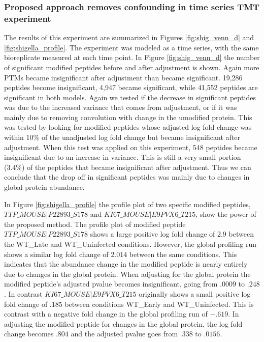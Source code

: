 \documentclass[mcp]{article}
\numberwithin{table}{section}
\begin{document}
\subsubsection*{Proposed approach removes confounding in time series TMT experiment}

The results of this experiment are summarized in Figures \ref{fig:shig_venn_d} and \ref{fig:shigella_profile}. The experiment was modeled as a time series, with the same bioreplicate measured at each time point. In Figure \ref{fig:shig_venn_d} the number of significant modified peptides before and after adjustment is shown. Again more PTMs became insignificant after adjustment than became significant. 19,286 peptides become insignificant, 4,947 became significant, while 41,552 peptides are significant in both models. Again we tested if the decrease in significant peptides was due to the increased variance that comes from adjustment, or if it was mainly due to removing convolution with change in the umodified protein. This was tested by looking for modified peptides whose adjusted log fold change was within 10\% of the unadjusted log fold change but became insignificant after adjustment. When this test was applied on this experiment, 548 peptides became insignificant due to an increase in variance. This is still a very small portion (3.4\%) of the peptides that became insignificant after adjustment. Thus we can conclude that the drop off in significant peptides was mainly due to changes in global protein abundance.

In Figure \ref{fig:shigella_profile} the profile plot of two specific modified peptides, $TTP\_MOUSE|P22893\_S178$ and $KI67\_MOUSE|E9PVX6\_T215$, show the power of the proposed method.  The profile plot of modified peptide $TTP\_MOUSE|P22893\_S178$ shows a large positive log fold change of $2.9$ between the WT\_Late and WT\_Uninfected conditions. However, the global profiling run shows a similar log fold change of $2.014$ between the same conditions. This indicates that the abundance change in the modified peptide is nearly entirely due to changes in the global protein. When adjusting for the global protein the modified peptide's adjusted pvalue becomes insignificant, going from $.0009$ to $.248$. In contrast $KI67\_MOUSE|E9PVX6\_T215$ originally shows a small positive log fold change of $.185$ between conditions WT\_Early and WT\_Uninfected. This is contrast with a negative fold change in the global profiling run of $-.619$. In adjusting the modified peptide for changes in the global protein, the log fold change becomes $.804$ and the adjusted pvalue goes from $.338$ to $.0156$.
\end{document}

